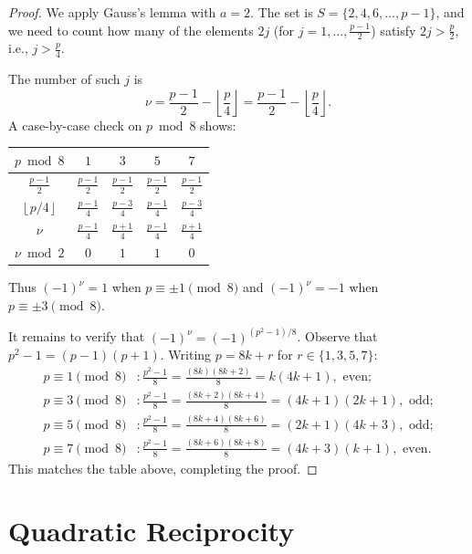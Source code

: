 \documentclass[12pt,a4paper,openany]{book}
\theoremstyle{definition}
\theoremstyle{plain}
\theoremstyle{remark}
\newcommand{\floor}[1]{\left\lfloor #1 \right\rfloor}
\begin{document}
\begin{proof}
We apply Gauss's lemma with $a = 2$. The set is $S = \{2, 4, 6, \ldots, p-1\}$,
and we need to count how many of the elements $2j$ (for $j = 1, \ldots, \frac{p-1}{2}$)
satisfy $2j > \frac{p}{2}$, i.e., $j > \frac{p}{4}$.

The number of such $j$ is
\[
  \nu = \frac{p-1}{2} - \floor{\frac{p}{4}} = \frac{p-1}{2} - \floor{\frac{p}{4}}.
\]
A case-by-case check on $p \bmod 8$ shows:
\begin{center}
\begin{tabular}{c|cccc}
  \toprule
  $p \bmod 8$ & $1$ & $3$ & $5$ & $7$ \\
  \midrule
  $\frac{p-1}{2}$ & $\frac{p-1}{2}$ & $\frac{p-1}{2}$ & $\frac{p-1}{2}$ & $\frac{p-1}{2}$ \\[3pt]
  $\floor{p/4}$ & $\frac{p-1}{4}$ & $\frac{p-3}{4}$ & $\frac{p-1}{4}$ & $\frac{p-3}{4}$ \\[3pt]
  $\nu$ & $\frac{p-1}{4}$ & $\frac{p+1}{4}$ & $\frac{p-1}{4}$ & $\frac{p+1}{4}$ \\[3pt]
  $\nu \bmod 2$ & $0$ & $1$ & $1$ & $0$ \\
  \bottomrule
\end{tabular}
\end{center}
Thus $(-1)^\nu = 1$ when $p \equiv \pm 1 \pmod{8}$ and $(-1)^\nu = -1$ when
$p \equiv \pm 3 \pmod{8}$.

It remains to verify that $(-1)^\nu = (-1)^{(p^2-1)/8}$.
Observe that $p^2 - 1 = (p-1)(p+1)$. Writing $p = 8k + r$ for $r \in \{1,3,5,7\}$:
\begin{align*}
  p \equiv 1 \pmod{8}&\colon \tfrac{p^2-1}{8} = \tfrac{(8k)(8k+2)}{8} = k(4k+1), \text{ even;}\\
  p \equiv 3 \pmod{8}&\colon \tfrac{p^2-1}{8} = \tfrac{(8k+2)(8k+4)}{8} = (4k+1)(2k+1), \text{ odd;}\\
  p \equiv 5 \pmod{8}&\colon \tfrac{p^2-1}{8} = \tfrac{(8k+4)(8k+6)}{8} = (2k+1)(4k+3), \text{ odd;}\\
  p \equiv 7 \pmod{8}&\colon \tfrac{p^2-1}{8} = \tfrac{(8k+6)(8k+8)}{8} = (4k+3)(k+1), \text{ even.}
\end{align*}
This matches the table above, completing the proof.
\end{proof}

\section{Quadratic Reciprocity}
\label{sec:qr-law}
\end{document}
